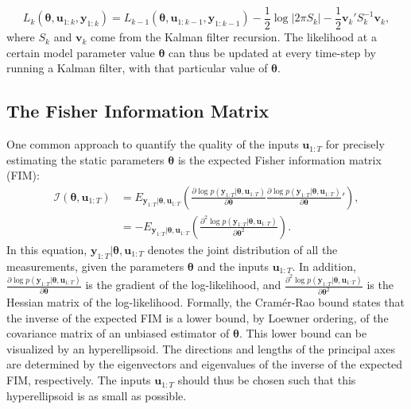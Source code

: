 \begin{equation}
L_k(\bm \theta, \bm u_{1:k}, \bm y_{1:k}) = L_{k-1}(\bm \theta, \bm u_{1:k-1}, \bm y_{1:k-1})
-\frac{1}{2}\log\left|2\pi S_k\right| -\frac{1}{2}\bm v_{k}' S_{k}^{-1}\bm v_{k},
\label{log likelihood}
\end{equation}
where $S_k$ and $\bm v_k$ come from the Kalman filter recursion. The likelihood at a certain model parameter value $\bm \theta$ can thus be updated at every time-step by running a Kalman filter, with that particular value of $\bm \theta$.
\subsection{The Fisher Information Matrix}
One common approach to quantify the quality of the inputs $\bm u_{1:T}$ for precisely estimating the static parameters $\bm \theta$ is the expected Fisher information matrix (FIM):
\begin{equation}
\begin{aligned}
\mathcal{I}(\bm \theta,\bm u_{1:T}) &= 
E_{\bm y_{1:T}|\bm \theta, \bm u_{1:T}} \left ( \frac{\partial \log p(\bm y_{1:T}|\bm \theta, \bm u_{1:T})}{\partial \bm \theta}
\frac{\partial \log p(\bm y_{1:T}|\bm \theta, \bm u_{1:T})}{\partial \bm \theta}' \right ),\\
&= -E_{\bm y_{1:T}|\bm \theta,\bm u_{1:T}}\left(\frac{\partial^2 \log p(\bm y_{1:T}|\bm \theta, \bm u_{1:T})}{\partial \bm \theta^2}\right).
\end{aligned}
\label{expectedFIM}
\end{equation}
In this equation, $\bm y_{1:T}|\bm \theta, \bm u_{1:T}$ denotes the joint distribution of all the measurements, given the parameters $\bm \theta$ and the inputs $\bm u_{1:T}$. In addition, $\frac{\partial \log p(\bm y_{1:T}|\bm \theta, \bm u_{1:T})}{\partial \bm \theta}$ is the gradient of the log-likelihood, and $\frac{\partial^2 \log p(\bm y_{1:T}|\bm \theta, \bm u_{1:T})}{\partial \bm \theta^2}$ is the Hessian matrix of the log-likelihood. Formally, the Cramér-Rao bound states that the inverse of the expected FIM is a lower bound, by Loewner ordering, of the covariance matrix of an unbiased estimator of $\bm \theta$. This lower bound can be visualized by an hyperellipsoid. The directions and lengths of the principal axes are determined by the eigenvectors and eigenvalues of the inverse of the expected FIM, respectively. The inputs $\bm u_{1:T}$ should thus be chosen such that this hyperellipsoid is as small as possible.
\\
